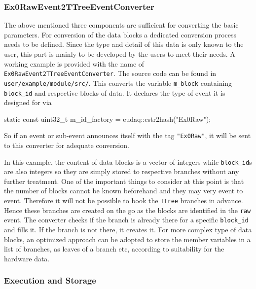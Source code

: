  \subsubsection{Ex0RawEvent2TTreeEventConverter}
The above mentioned three components are sufficient for converting the basic parameters. For conversion of the data blocks a dedicated conversion process needs to be defined. Since the type and detail of this data is only known to the user, this part is mainly to be developed by the users to meet their needs. A working example is provided with the name of \lstinline[style=cpp]{Ex0RawEvent2TTreeEventConverter}. The source code can be found in \\ \lstinline[style=cpp]{user/example/module/src/}. This converts the variable \lstinline[style=cpp]{m_block} containing \lstinline[style=cpp]{block_id} and respective blocks of data. It declares the type of event it is designed for via 
\begin{listing}[mybash]
static const uint32_t m_id_factory = eudaq::cstr2hash("Ex0Raw");
\end{listing}
So if an event or sub-event announces itself with the tag \lstinline[style=cpp]{"Ex0Raw"}, it will be sent to this converter for adequate conversion. 


In this example, the content of data blocks is a vector of integers while \lstinline[style=cpp]{block_id}s are also integers so they are simply stored to respective branches without any further treatment. One of the important things to consider at this point is that the number of blocks cannot be known beforehand and they may very event to event. Therefore it will not be possible to book the \lstinline[style=cpp]{TTree} branches in advance. Hence these branches are created on the go as the blocks are identified in the \lstinline[style=cpp]{raw} event. The converter checks if the branch is already there for a specific \lstinline[style=cpp]{block_id} and fills it. If the branch is not there, it creates it. For more complex type of data blocks, an optimized approach can be adopted to store the member variables in a list of branches, as leaves of a branch etc, according to suitability for the hardware data. 

\subsubsection{Execution and Storage}

